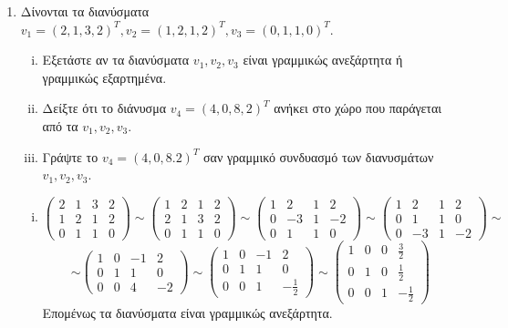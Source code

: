 \begin{center}
\minibox{\bfseries\Large \textcolor{Col1}{Λυμένα Θέματα}}
\end{center}

\vspace{\baselineskip}

\begin{enumerate}[1.]
\item Δίνονται τα διανύσματα $v_1=(2,1,3,2)^T, v_2=(1,2,1,2)^T, v_3=(0,1,1,0)^T$.
\begin{enumerate}[i)]
\item Εξετάστε αν τα διανύσματα $v_1,v_2,v_3$ είναι γραμμικώς ανεξάρτητα ή γραμμικώς εξαρτημένα.
\item Δείξτε ότι το διάνυσμα $v_4=(4,0,8,2)^T$ ανήκει στο χώρο που παράγεται από τα $v_1,v_2,v_3$.
\item Γράψτε το $v_4=(4,0,8.2)^T$ σαν γραμμικό συνδυασμό των διανυσμάτων $v_1,v_2,v_3$.
\end{enumerate}

\vspace{\baselineskip}


\vspace{\baselineskip}

\begin{enumerate}[i)]
\item \[
\begin{pmatrix}
2 & 1 & 3 & 2 \\
1 & 2 & 1 & 2 \\
0 & 1 & 1 & 0
\end{pmatrix}
\sim
\begin{pmatrix}
1 & 2 & 1 & 2 \\
2 & 1 & 3 & 2 \\
0 & 1 & 1 & 0 
\end{pmatrix}
\sim
\begin{pmatrix}
1 & 2 & 1 & 2 \\
0 & -3 & 1 & -2 \\
0 & 1 & 1 & 0
\end{pmatrix}
\sim
\begin{pmatrix}
1 & 2 & 1 & 2 \\
0 & 1 & 1 & 0 \\
0 & -3 & 1 & -2
\end{pmatrix}
\sim
\]
\[
\sim
\begin{pmatrix}
1 & 0 & -1 & 2 \\
0 & 1 & 1 & 0 \\
0 & 0 & 4 & -2
\end{pmatrix}
\sim
\begin{pmatrix}
1 & 0 & -1 & 2 \\
0 & 1 & 1 & 0 \\
0 & 0 & 1 & -\frac{1}{2}
\end{pmatrix}
\sim
\begin{pmatrix}
1 & 0 & 0 & \frac{3}{2} \\
0 & 1 & 0 & \frac{1}{2} \\
0 & 0 & 1 & -\frac{1}{2}
\end{pmatrix}
\]
Επομένως τα διανύσματα είναι γραμμικώς ανεξάρτητα.


\end{enumerate}
\end{enumerate}
